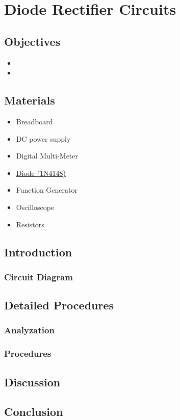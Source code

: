 \chapter{Diode Rectifier Circuits}


\section{Objectives}
\begin{itemize}
    \item 
    \item 
\end{itemize}

\section{Materials}
\begin{itemize}
    \item Breadboard
    \item DC power supply
    \item Digital Multi-Meter
    \item \hyperref[1N4148]{Diode (1N4148)}
    \item Function Generator
    \item Oscilloscope
    \item Resistors
\end{itemize}

\section{Introduction}
    \subsection{Circuit Diagram}


\section{Detailed Procedures}
    \subsection{Analyzation}
    

    \subsection{Procedures}

    
\section{Discussion}


\section{Conclusion}
